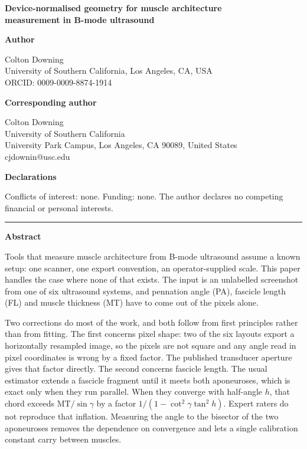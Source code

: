 \documentclass[11pt]{article}
\begin{document}
\begin{center}
{\Large\bfseries Device-normalised geometry for muscle architecture\\[4pt]
measurement in B-mode ultrasound}
\end{center}
\vspace{1.5em}

\noindent\textbf{Author}
\vspace{0.4em}

\noindent Colton Downing\\
University of Southern California, Los Angeles, CA, USA\\
ORCID: 0009-0009-8874-1914
\vspace{1.2em}

\noindent\textbf{Corresponding author}
\vspace{0.4em}

\noindent Colton Downing\\
University of Southern California\\
University Park Campus, Los Angeles, CA 90089, United States\\
cjdownin@usc.edu
\vspace{1.2em}

\noindent\textbf{Declarations}
\vspace{0.4em}

\noindent Conflicts of interest: none. Funding: none. The author declares no competing
financial or personal interests.
\vspace{1.5em}

\hrule
\vspace{1.5em}

\noindent\textbf{\large Abstract}
\vspace{0.8em}

Tools that measure muscle architecture from B-mode ultrasound assume a known
setup: one scanner, one export convention, an operator-supplied scale. This
paper handles the case where none of that exists. The input is an unlabelled
screenshot from one of six ultrasound systems, and pennation angle (PA),
fascicle length (FL) and muscle thickness (MT) have to come out of the pixels
alone.

Two corrections do most of the work, and both follow from first principles
rather than from fitting. The first concerns pixel shape: two of the six
layouts export a horizontally resampled image, so the pixels are not square and
any angle read in pixel coordinates is wrong by a fixed factor. The published
transducer aperture gives that factor directly. The second concerns fascicle
length. The usual estimator extends a fascicle fragment until it meets both
aponeuroses, which is exact only when they run parallel. When they converge with
half-angle $h$, that chord exceeds $\mathrm{MT}/\sin\gamma$ by a factor
$1/(1-\cot^{2}\gamma\tan^{2}h)$. Expert raters do not reproduce that inflation.
Measuring the angle to the bisector of the two aponeuroses removes the
dependence on convergence and lets a single calibration constant carry between
muscles.
\end{document}
